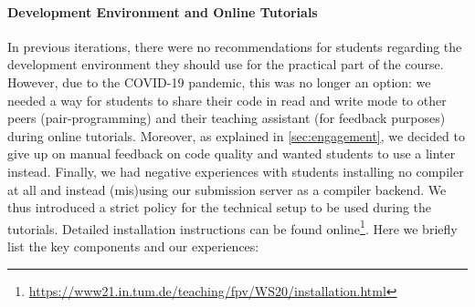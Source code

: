 \paragraph{Development Environment and Online Tutorials}
In previous iterations,
there were no recommendations for students regarding the development environment they should use for the practical part of the course.
However, due to the COVID-19 pandemic,
this was no longer an option:
we needed a way for students to share their code in read and write mode
to other peers (pair-programming) and their teaching assistant (for feedback purposes) during online tutorials.
Moreover, as explained in \cref{sec:engagement},
we decided to give up on manual feedback on code quality
and wanted students to use a linter instead.
Finally, we had negative experiences with students
installing no compiler at all
and instead (mis)using our submission server as a compiler backend.
We thus introduced a strict policy
for the technical setup to be used during
the tutorials.
Detailed installation instructions can be found online\footnote{\url{https://www21.in.tum.de/teaching/fpv/WS20/installation.html}}.
Here we briefly list the key components and our experiences:
